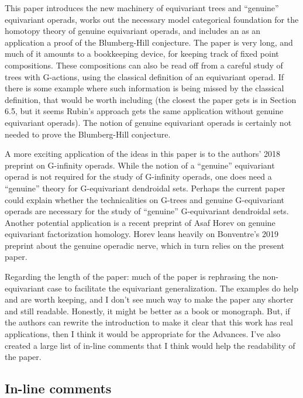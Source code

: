 \documentclass{article}
\begin{document}
This paper introduces the new machinery of equivariant trees and ``genuine'' equivariant operads, works out the necessary model categorical foundation for the homotopy theory of genuine equivariant operads, and includes an as an application a proof of the Blumberg-Hill conjecture. The paper is very long, and much of it amounts to a bookkeeping device, for keeping track of fixed point compositions. These compositions can also be read off from a careful study of trees with G-actions, using the classical definition of an equivariant operad. If there is some example where such information is being missed by the classical definition, that would be worth including (the closest the paper gets is in Section 6.5, but it seems Rubin's approach gets the same application without genuine equivariant operads). The notion of genuine equivariant operads is certainly not needed to prove the Blumberg-Hill conjecture.

A more exciting application of the ideas in this paper is to the authors' 2018 preprint on G-infinity operads. While the notion of a ``genuine'' equivariant operad is not required for the study of G-infinity operads, one does need a ``genuine'' theory for G-equivariant dendroidal sets. Perhaps the current paper could explain whether the technicalities on G-trees and genuine G-equivariant operads are necessary for the study of ``genuine'' G-equivariant dendroidal sets. Another potential application is a recent preprint of Asaf Horev on genuine equivariant factorization homology. Horev leans heavily on Bonventre's 2019 preprint about the genuine operadic nerve, which in turn relies on the present paper.

Regarding the length of the paper: much of the paper is rephrasing the non-equivariant case to facilitate the equivariant generalization. The examples do help and are worth keeping, and I don't see much way to make the paper any shorter and still readable. Honestly, it might be better as a book or monograph. But, if the authors can rewrite the introduction to make it clear that this work has real applications, then I think it would be appropriate for the Advances. I've also created a large list of in-line comments that I think would help the readability of the paper.


\subsection*{In-line comments}
\end{document}
